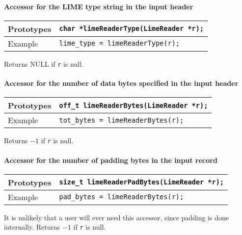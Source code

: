 \documentclass{article}
\begin{document}
\paragraph{Accessor for the LIME type string in the input header}
%
\begin{flushleft}
  \begin{tabular}{|l|l|}
  \hline
  Prototypes     & \verb|char *limeReaderType(LimeReader *r);| \\
\hline
  Example  & \verb|lime_type = limeReaderType(r);| \\
   \hline
 \end{tabular}
\end{flushleft}
%
Returns NULL if {\tt r} is null.

\paragraph{Accessor for the number of data bytes specified in the input header}
%
\begin{flushleft}
  \begin{tabular}{|l|l|}
  \hline
  Prototypes     & \verb|off_t limeReaderBytes(LimeReader *r);| \\
\hline
  Example  & \verb|tot_bytes = limeReaderBytes(r);| \\
   \hline
 \end{tabular}
\end{flushleft}
%
Returns $-1$ if {\tt r} is null.

\paragraph{Accessor for the number of padding bytes in the input record}
%
\begin{flushleft}
  \begin{tabular}{|l|l|}
  \hline
  Prototypes     & \verb|size_t limeReaderPadBytes(LimeReader *r);| \\
\hline
  Example  & \verb|pad_bytes = limeReaderBytes(r);| \\
   \hline
 \end{tabular}
\end{flushleft}
%
It is unlikely that a user will ever need this accessor, since padding
is done internally.  Returns $-1$ if {\tt r} is null.
\end{document}
